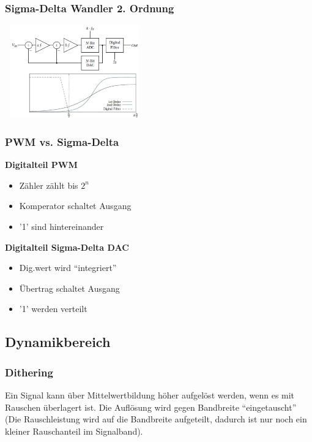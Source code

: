\begin{multicols}{2}
  \subsubsection{Sigma-Delta Wandler 2. Ordnung}
    \includegraphics[width=6cm, height =4cm]{pictures/deltaSigma2}
  
  \columnbreak
  
  \subsubsection{PWM vs. Sigma-Delta}
      \textbf{Digitalteil PWM}
      \begin{itemize}
        \item Zähler zählt bis $2^n$
        \item Komperator schaltet Ausgang
        \item '1' sind hintereinander
      \end{itemize}
      
      \textbf{Digitalteil Sigma-Delta DAC}
      \begin{itemize}
        \item Dig.wert wird "`integriert"'
        \item Übertrag schaltet Ausgang
        \item '1' werden verteilt
      \end{itemize}
\end{multicols}

\subsection{Dynamikbereich}
\subsubsection{Dithering}
  Ein Signal kann über Mittelwertbildung höher aufgelöst werden, wenn es mit Rauschen überlagert ist.
  Die Auflösung wird gegen Bandbreite "`eingetauscht"' (Die Rauschleistung wird auf die Bandbreite aufgeteilt,
  dadurch ist nur noch ein kleiner Rauschanteil im Signalband).
  
